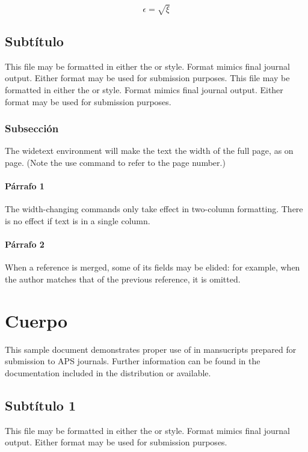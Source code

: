 \documentclass[%
 reprint,
 amsmath,amssymb,
 aps,
]{revtex4-2}
\begin{document}
\begin{equation}
\label{eq:ez02}
\epsilon = \sqrt{\xi}
\end{equation}

\subsection{Subtítulo}

This file may be \cite{ballagh2000a} formatted in either the or style. Format mimics final journal output. Either format may be used for submission purposes. This file may be formatted in either the or style. Format mimics final journal output. Either format may be used for submission purposes.

\subsubsection{Subsección}
The widetext environment will make the text the width of the
full page, as on page. (Note the use command to refer to the page number.) 

\paragraph{Párrafo 1}
The width-changing commands \cite{witten2001} only take effect in two-column formatting. There is no effect if text is in a single column.

\paragraph{Párrafo 2}
When a reference is merged, some of its fields may be elided: for example, when the author matches that of the previous reference, it is omitted. 

\section{\label{sec:level1}Cuerpo}

This sample document demonstrates proper use of in mansucripts prepared for submission to APS journals. Further information can be found in the documentation included in the distribution or available.

\subsection{Subtítulo 1}

This file may be formatted in either the or style. Format mimics final journal output. Either format may be used for submission purposes.
\end{document}
